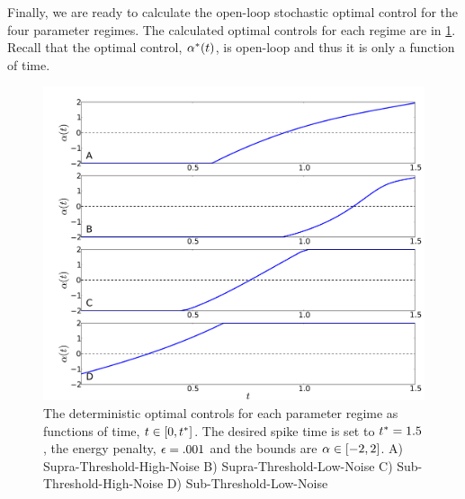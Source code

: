 \documentclass{article}
\begin{document}
Finally, we are ready to calculate the open-loop stochastic optimal control for
the four parameter regimes. The calculated optimal controls for each regime are
in \cref{fig:FBK_Regimes_cs}. Recall that the optimal control, ${\alpha}^*(t)$, is
open-loop and thus it is only a function of time.
\begin{figure}[htp]
\begin{center}
  \includegraphics[width=.99\textwidth]{Figs/FP_Adjoint/Regimes_cs.pdf}  
  \caption[labelInTOC]{The deterministic optimal controls for each parameter
  regime as functions of time, $t \in [0, { t^* }]$.
  The desired spike time is set to ${ t^* }=1.5$, the energy penalty, ${\epsilon}
  = .001$ and the bounds are ${\alpha} \in [-2,2]$.
  A) Supra-Threshold-High-Noise B) Supra-Threshold-Low-Noise 
C) Sub-Threshold-High-Noise   D) Sub-Threshold-Low-Noise  }
  \label{fig:FBK_Regimes_cs}   
\end{center}
\end{figure} 
\end{document}
